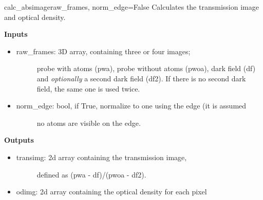 \documentclass[letterpaper,10pt,english]{manual}
\begin{document}
\hypertarget{odysseus.imageprocess.calc_absimage}{}\begin{funcdesc}{calc\_absimage}{raw\_frames, norm\_edge=False}
Calculates the transmission image and optical density.

\textbf{Inputs}
\begin{itemize}
\item {} \begin{description}
\item[raw\_frames: 3D array, containing three or four images;] \leavevmode
probe with atoms (pwa), probe without atoms (pwoa),
dark field (df) and \emph{optionally} a second dark field (df2).
If there is no second dark field, the same one is used
twice.

\end{description}

\item {} \begin{description}
\item[norm\_edge: bool, if True, normalize to one using the edge (it is assumed] \leavevmode
no atoms are visible on the edge.

\end{description}

\end{itemize}

\textbf{Outputs}
\begin{itemize}
\item {} \begin{description}
\item[transimg: 2d array containing the transmission image,] \leavevmode
defined as (pwa - df)/(pwoa - df2).

\end{description}

\item {} 
odimg: 2d array containing the optical density for each pixel

\end{itemize}
\end{funcdesc}
\end{document}
